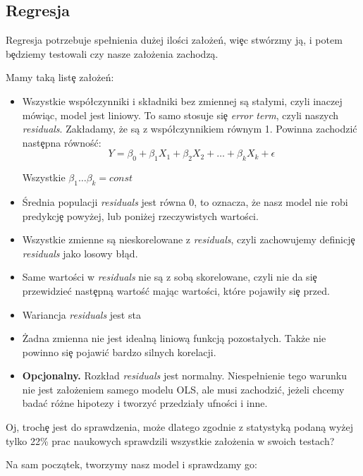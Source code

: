 \documentclass{article}
\begin{document}
\subsection{Regresja}
\quad Regresja potrzebuje spe\l nienia dużej ilości za\l ożeń, wi\c ec stwórzmy ją, i potem b\c edziemy testowali czy nasze za\l ożenia zachodzą.

\noindent
\quad Mamy taką list\c e za\l ożeń:

\begin{itemize}
  \item Wszystkie wspó\l czynniki i sk\l adniki bez zmiennej są sta\l ymi, czyli inaczej mówiąc, model jest liniowy. To samo stosuje si\c e \textit{error term}, czyli naszych \textit{residuals}. Zak\l adamy, że są z wspó\l czynnikiem równym 1. Powinna zachodzi\'c nast\c epna równoś\'c:
  \[ Y = \beta_0 + \beta_1X_1 + \beta_2X_2 + \dots + \beta_kX_k + \epsilon \]
  
  \noindent
  \quad Wszystkie $\beta_1 \dots \beta_k = const$
  \item Średnia populacji \textit{residuals} jest równa 0, to oznacza, że nasz model nie robi predykcj\c e powyżej, lub poniżej rzeczywistych wartości.
  \item Wszystkie zmienne są nieskorelowane z \textit{residuals}, czyli zachowujemy definicj\c e \textit{residuals} jako losowy b\l ąd.
  \item Same wartości w \textit{residuals} nie są z sobą skorelowane, czyli nie da si\c e przewidzie\'c nast\c epną wartoś\'c mając wartości, które pojawi\l y si\c e przed.
  \item Wariancja \textit{residuals} jest sta
  \item Żadna zmienna nie jest idealną liniową funkcją pozosta\l ych. Także nie powinno si\c e pojawi\'c bardzo silnych korelacji.
  \item \textbf{Opcjonalny.} Rozk\l ad \textit{residuals} jest normalny. Niespe\l nienie tego warunku nie jest za\l ożeniem samego modelu OLS, ale musi zachodzi\'c, jeżeli chcemy bada\'c różne hipotezy i tworzy\'c przedzia\l y ufności i inne.
\end{itemize}

\noindent
\quad Oj, troch\c e jest do sprawdzenia, może dlatego zgodnie z statystyką podaną wyżej tylko 22\% prac naukowych sprawdzili wszystkie za\l ożenia w swoich testach?

\noindent
\quad Na sam początek, tworzymy nasz model i sprawdzamy go:
\end{document}
